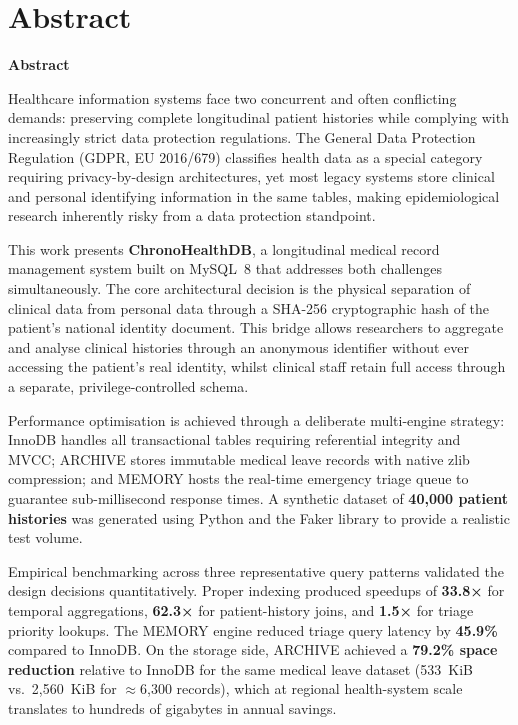 \documentclass[../main.tex]{subfiles}
\begin{document}
\makeatletter
\renewenvironment{abstract}{%
    \if@twocolumn
      \section*{Abstract \\}%
    \else
    \begin{flushright}
        {\filleft\Huge\bfseries\fontsize{48pt}{12}\selectfont Abstract\vspace{\z@}}%
        \end{flushright}
      \quotation
    \fi}
    {\if@twocolumn\else\endquotation\fi}
\makeatother

\begin{abstract}

Healthcare information systems face two concurrent and often conflicting demands: preserving complete longitudinal patient histories while complying with increasingly strict data protection regulations. The General Data Protection Regulation (GDPR, EU 2016/679) classifies health data as a special category requiring privacy-by-design architectures, yet most legacy systems store clinical and personal identifying information in the same tables, making epidemiological research inherently risky from a data protection standpoint.

This work presents \textbf{ChronoHealthDB}, a longitudinal medical record management system built on MySQL~8 that addresses both challenges simultaneously. The core architectural decision is the physical separation of clinical data from personal data through a SHA-256 cryptographic hash of the patient's national identity document. This bridge allows researchers to aggregate and analyse clinical histories through an anonymous identifier without ever accessing the patient's real identity, whilst clinical staff retain full access through a separate, privilege-controlled schema.

Performance optimisation is achieved through a deliberate multi-engine strategy: InnoDB handles all transactional tables requiring referential integrity and MVCC; ARCHIVE stores immutable medical leave records with native zlib compression; and MEMORY hosts the real-time emergency triage queue to guarantee sub-millisecond response times. A synthetic dataset of \textbf{40,000 patient histories} was generated using Python and the Faker library to provide a realistic test volume.

Empirical benchmarking across three representative query patterns validated the design decisions quantitatively. Proper indexing produced speedups of \textbf{33.8×} for temporal aggregations, \textbf{62.3×} for patient-history joins, and \textbf{1.5×} for triage priority lookups. The MEMORY engine reduced triage query latency by \textbf{45.9\%} compared to InnoDB. On the storage side, ARCHIVE achieved a \textbf{79.2\% space reduction} relative to InnoDB for the same medical leave dataset (533~KiB vs.\ 2,560~KiB for $\approx$6,300 records), which at regional health-system scale translates to hundreds of gigabytes in annual savings.


\end{abstract}
\end{document}
